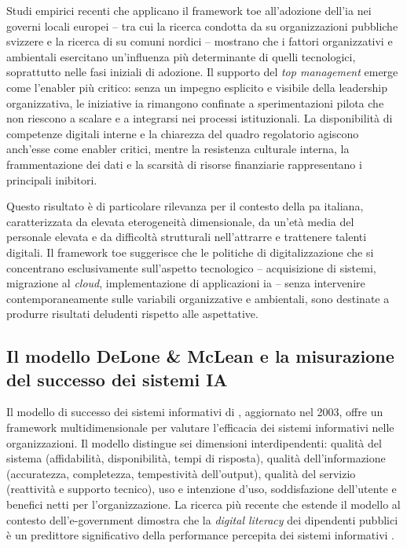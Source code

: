Studi empirici recenti che applicano il framework \gls{toe} all'adozione dell'\gls{ia} nei governi locali europei -- tra cui la ricerca condotta da \textcite{Neumann2024} su organizzazioni pubbliche svizzere e la ricerca di \textcite{Mikalef2022} su comuni nordici -- mostrano che i fattori organizzativi e ambientali esercitano un'influenza più determinante di quelli tecnologici, soprattutto nelle fasi iniziali di adozione. Il supporto del \textit{top management} emerge come l'enabler più critico: senza un impegno esplicito e visibile della leadership organizzativa, le iniziative \gls{ia} rimangono confinate a sperimentazioni pilota che non riescono a scalare e a integrarsi nei processi istituzionali. La disponibilità di competenze digitali interne e la chiarezza del quadro regolatorio agiscono anch'esse come enabler critici, mentre la resistenza culturale interna, la frammentazione dei dati e la scarsità di risorse finanziarie rappresentano i principali inibitori.

Questo risultato è di particolare rilevanza per il contesto della \gls{pa} italiana, caratterizzata da elevata eterogeneità dimensionale, da un'età media del personale elevata e da difficoltà strutturali nell'attrarre e trattenere talenti digitali. Il framework \gls{toe} suggerisce che le politiche di digitalizzazione che si concentrano esclusivamente sull'aspetto tecnologico -- acquisizione di sistemi, migrazione al \textit{cloud}, implementazione di applicazioni \gls{ia} -- senza intervenire contemporaneamente sulle variabili organizzative e ambientali, sono destinate a produrre risultati deludenti rispetto alle aspettative.

\subsection{Il modello DeLone \& McLean e la misurazione del successo dei sistemi IA}

Il modello di successo dei sistemi informativi di \textcite{DeLone1992}, aggiornato nel 2003, offre un framework multidimensionale per valutare l'efficacia dei sistemi informativi nelle organizzazioni. Il modello distingue sei dimensioni interdipendenti: qualità del sistema (affidabilità, disponibilità, tempi di risposta), qualità dell'informazione (accuratezza, completezza, tempestività dell'output), qualità del servizio (reattività e supporto tecnico), uso e intenzione d'uso, soddisfazione dell'utente e benefici netti per l'organizzazione. La ricerca più recente che estende il modello al contesto dell'e-government dimostra che la \textit{digital literacy} dei dipendenti pubblici è un predittore significativo della performance percepita dei sistemi informativi \parencite{Abdulkareem2021}.

